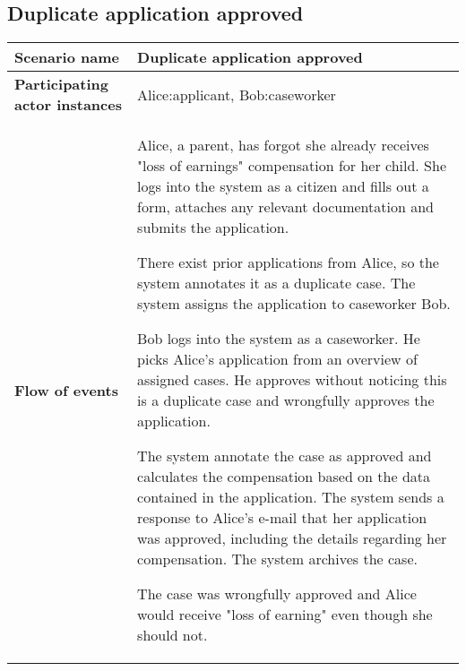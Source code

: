\subsection*{Duplicate application approved}
\begin{table}[htb!]
\begin{tabularx}{\textwidth}{l|X}
	\textbf{Scenario name} &  Duplicate application approved\\
	\hline
	\textbf{Participating actor instances} & Alice:applicant, Bob:caseworker\\
	\hline
	\textbf{Flow of events} &
    \begin{compactenum}
	        \item Alice, a parent, has forgot she already receives "loss of earnings" compensation for her child. She logs into the system as a citizen and fills out a form, attaches any relevant documentation and submits the application.
	        \item There exist prior applications from Alice, so the system annotates it as a duplicate case. The system assigns the application to caseworker Bob.
	        \item Bob logs into the system as a caseworker. He picks Alice's application from an overview of assigned cases. He approves without noticing this is a duplicate case and wrongfully approves the application.
	        \item The system annotate the case as approved and calculates the compensation based on the data contained in the application. The system sends a response to Alice's e-mail that her application was approved, including the details regarding her compensation. The system archives the case.
	        \item The case was wrongfully approved and Alice would receive "loss of earning" even though she should not.
    \end{compactenum}\\
	\hline
\end{tabularx}
\end{table}

